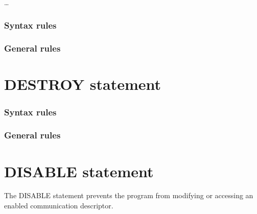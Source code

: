 \begin{syntax}[\miscextcolour]
   
  \begin{1=}
    \filename
  \end{1=} \ldots
\end{syntax}

\subsubsection{Syntax rules}

\subsubsection{General rules}

\section{DESTROY statement}

\begin{syntax}[\miscextcolour]
\end{syntax}

\subsubsection{Syntax rules}

\subsubsection{General rules}

\section{DISABLE statement}

The DISABLE statement prevents the program from modifying or accessing an enabled communication descriptor.

\begin{syntax}[\deletedcolour]
\end{syntax}

